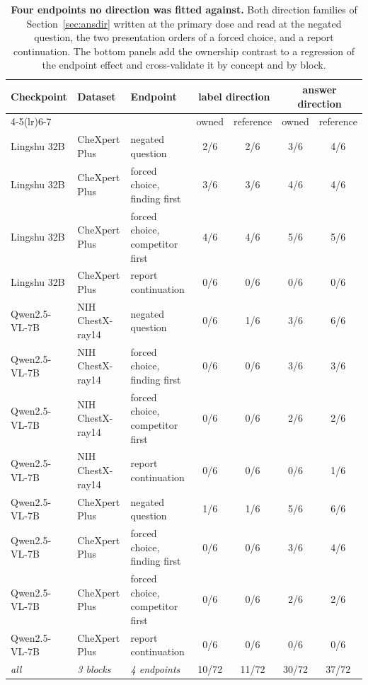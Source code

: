 \documentclass{article}
\begin{document}
\begin{table}[htbp]
\centering
\scriptsize
\setlength{\tabcolsep}{3pt}
\caption{\textbf{Four endpoints no direction was fitted against.} Both direction families of Section~\ref{sec:ansdir} written at the primary dose and read at the negated question, the two presentation orders of a forced choice, and a report continuation. The bottom panels add the ownership contrast to a regression of the endpoint effect and cross-validate it by concept and by block.}
\label{tab:cf-semend}
\begin{tabular}{lllcccc}
\toprule
\multirow{2}{*}{Checkpoint} & \multirow{2}{*}{Dataset} & \multirow{2}{*}{Endpoint} & \multicolumn{2}{c}{label direction} & \multicolumn{2}{c}{answer direction}\\
\cmidrule(lr){4-5}\cmidrule(lr){6-7}
&  &  & \multicolumn{1}{c}{owned} & \multicolumn{1}{c}{reference} & \multicolumn{1}{c}{owned} & \multicolumn{1}{c}{reference}\\
\midrule
Lingshu 32B & CheXpert Plus & negated question & 2/6 & 2/6 & 3/6 & 4/6 \\
Lingshu 32B & CheXpert Plus & forced choice, finding first & 3/6 & 3/6 & 4/6 & 4/6 \\
Lingshu 32B & CheXpert Plus & forced choice, competitor first & 4/6 & 4/6 & 5/6 & 5/6 \\
Lingshu 32B & CheXpert Plus & report continuation & 0/6 & 0/6 & 0/6 & 0/6 \\
Qwen2.5-VL-7B & NIH ChestX-ray14 & negated question & 0/6 & 1/6 & 3/6 & 6/6 \\
Qwen2.5-VL-7B & NIH ChestX-ray14 & forced choice, finding first & 0/6 & 0/6 & 3/6 & 3/6 \\
Qwen2.5-VL-7B & NIH ChestX-ray14 & forced choice, competitor first & 0/6 & 0/6 & 2/6 & 2/6 \\
Qwen2.5-VL-7B & NIH ChestX-ray14 & report continuation & 0/6 & 0/6 & 0/6 & 1/6 \\
Qwen2.5-VL-7B & CheXpert Plus & negated question & 1/6 & 1/6 & 5/6 & 6/6 \\
Qwen2.5-VL-7B & CheXpert Plus & forced choice, finding first & 0/6 & 0/6 & 3/6 & 4/6 \\
Qwen2.5-VL-7B & CheXpert Plus & forced choice, competitor first & 0/6 & 0/6 & 2/6 & 2/6 \\
Qwen2.5-VL-7B & CheXpert Plus & report continuation & 0/6 & 0/6 & 0/6 & 0/6 \\
\midrule
\textit{all} & \textit{3 blocks} & \textit{4 endpoints} & 10/72 & 11/72 & 30/72 & 37/72 \\

\end{tabular}
\end{table}
\end{document}
